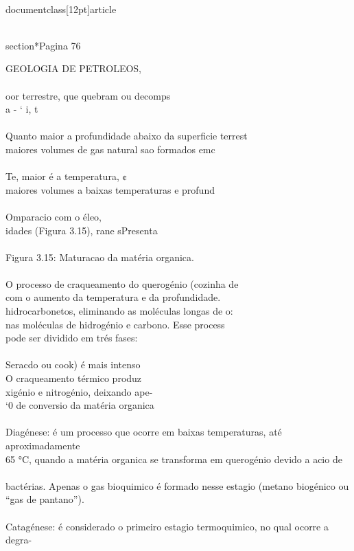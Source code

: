 \\documentclass[12pt]{article}
\begin{document}
\\section*{Pagina 76}

GEOLOGIA DE PETROLEOS,\\
\\
oor terrestre, que quebram ou decomps\\
a - ‘ i, t\\
\\
Quanto maior a profundidade abaixo da superficie terrest\\
maiores volumes de gas natural sao formados emc\\
\\
Te, maior é a temperatura, ¢\\
maiores volumes a baixas temperaturas e profund\\
\\
Omparacio com o éleo,\\
idades (Figura 3.15), rane sPresenta\\
\\
Figura 3.15: Maturacao da matéria organica.\\
\\
O processo de craqueamento do querogénio (cozinha de\\
com o aumento da temperatura e da profundidade.\\
hidrocarbonetos, eliminando as moléculas longas de o:\\
nas moléculas de hidrogénio e carbono. Esse process\\
pode ser dividido em trés fases:\\
\\
Seracdo ou cook) é mais intenso\\
O craqueamento térmico produz\\
xigénio e nitrogénio, deixando ape-\\
‘0 de conversio da matéria organica\\
\\
Diagénese: é um processo que ocorre em baixas temperaturas, até aproximadamente\\
65 °C, quando a matéria organica se transforma em querogénio devido a acio de\\
\\
bactérias. Apenas o gas bioquimico é formado nesse estagio (metano biogénico ou\\
“gas de pantano”).\\
\\
Catagénese: é considerado o primeiro estagio termoquimico, no qual ocorre a degra-\\
\end{document}
